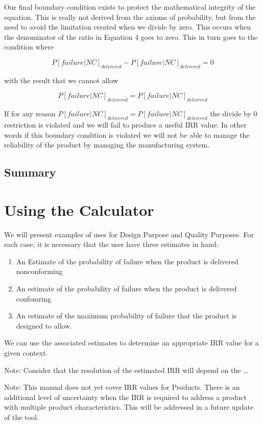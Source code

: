 \documentclass[
]{article}
\providecommand{\tightlist}{%
  \setlength{\itemsep}{0pt}\setlength{\parskip}{0pt}}
\begin{document}
Our final boundary condition exists to protect the mathematical integrity of the equation. This is really not derived from the axioms of probability, but from the need to avoid the limitation created when we divide by zero. This occurs when the denominator of the ratio in Equation 4 goes to zero. This in turn goes to the condition where

\[P[failure|NC]_{delivered} - P[failure|NC]_{delivered} = 0\]

with the result that we cannot allow

\[P[failure|NC]_{delivered} = P[failure|NC]_{delivered}\]

If for any reason \(P[failure|NC]_{delivered} = P[failure|NC]_{delivered}\) the divide by 0 restriction is violated and we will fail to produce a useful IRR value. In other words if this boundary condition is violated we will not be able to manage the reliability of the product by managing the manufacturing system.

\subsection{Summary}\label{summary}

\section{Using the Calculator}\label{using-the-calculator}

We will present examples of uses for Design Purpose and Quality Purposes. For each case, it is necessary that the user have three estimates in hand:

\begin{enumerate}
\def\labelenumi{\arabic{enumi}.}
\tightlist
\item
  An Estimate of the probability of failure when the product is delivered nonconforming
\item
  An estimate of the probability of failure when the product is delivered confomring
\item
  An estimate of the maximum probability of failure that the product is designed to allow.
\end{enumerate}

We can use the associated estimates to determine an appropriate IRR value for a given context.

Note: Consider that the resolution of the estimated IRR will depend on the \ldots{}

Note: This manual does not yet cover IRR values for Products. There is an additional level of uncertainty when the IRR is required to address a product with multiple product characteristics. This will be addressed in a future update of the tool.
\end{document}
